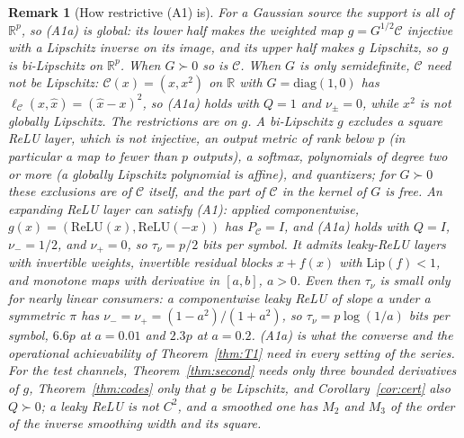 \documentclass[11pt,onecolumn]{IEEEtran}
\newtheorem{remark}[theorem]{Remark}
\newcommand{\R}{\mathbb{R}}
\newcommand{\PC}{P_{\mathcal C}}
\newcommand{\nup}{\nu_{+}}
\newcommand{\num}{\nu_{-}}
\begin{document}
\begin{remark}[How restrictive (A1) is]\label{rem:restrictive}
For a Gaussian source the support is all of $\R^p$, so (A1a) is global: its lower half
makes the weighted map $g=G^{1/2}\mathcal C$ injective with a Lipschitz inverse on its
image, and its upper half makes $g$ Lipschitz, so $g$ is bi-Lipschitz on $\R^p$. When
$G\succ0$ so is $\mathcal C$. When $G$ is only semidefinite, $\mathcal C$ need not be
Lipschitz: $\mathcal C(x)=(x,x^2)$ on $\R$ with $G=\mathrm{diag}(1,0)$ has
$\ell_{\mathcal C}(x,\hat x)=(\hat x-x)^2$, so (A1a) holds with $Q=1$ and $\nu_\pm=0$,
while $x^2$ is not globally Lipschitz. The restrictions are on $g$. A bi-Lipschitz $g$
excludes a square ReLU layer, which is not injective, an output metric of rank below $p$
(in particular a map to fewer than $p$ outputs), a softmax, polynomials of degree two or
more (a globally Lipschitz polynomial is affine), and quantizers; for $G\succ0$ these
exclusions are of $\mathcal C$ itself, and the part of $\mathcal C$ in the kernel of $G$ is
free. An expanding ReLU layer can satisfy (A1): applied componentwise,
$g(x)=(\mathrm{ReLU}(x),\mathrm{ReLU}(-x))$ has $\PC=I$, and (A1a) holds with $Q=I$,
$\num=1/2$, and $\nup=0$, so $\tau_\nu=p/2$ bits per symbol. It admits leaky-ReLU layers with invertible weights, invertible
residual blocks $x+f(x)$ with $\mathrm{Lip}(f)<1$, and monotone maps with derivative in
$[a,b]$, $a>0$. Even then $\tau_\nu$ is small only for nearly linear consumers: a
componentwise leaky ReLU of slope $a$ under a symmetric $\pi$ has
$\num=\nup=(1-a^2)/(1+a^2)$, so $\tau_\nu=p\log(1/a)$ bits per symbol, $6.6p$ at
$a=0.01$ and $2.3p$ at $a=0.2$. (A1a) is what the converse and the operational
achievability of Theorem~\ref{thm:T1} need in every setting of the series. For the test
channels, Theorem~\ref{thm:second} needs only three bounded derivatives of $g$,
Theorem~\ref{thm:codes} only that $g$ be Lipschitz, and Corollary~\ref{cor:cert} also
$Q\succ0$; a leaky ReLU is not $C^2$, and a smoothed one has $M_2$ and $M_3$ of the
order of the inverse smoothing width and its square.
\end{remark}
\end{document}
